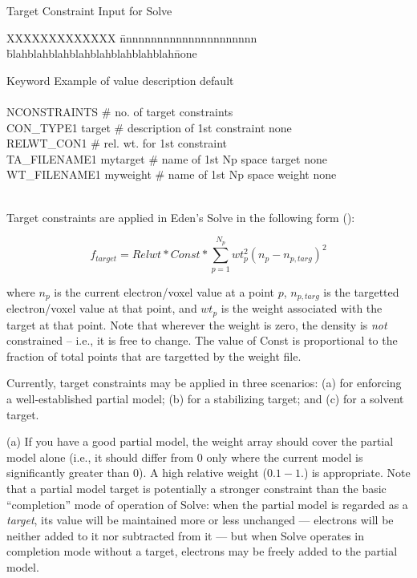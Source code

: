 \documentclass{report}
\begin{document}
{\begin{table} [htb]
\caption {\large Target Constraint Input for Solve}
\label{table-target}

\begin{tabbing}
XXXXXXXXXXXXX \= nnnnnnnnnnnnnnnnnnnnnn \= 
blahblahblahblahblahblahblahblah\= none \kill

Keyword \> Example of value \> description \> default \\
\\ 
NCONSTRAINTS  \> \# no. of target constraints  \\
CON\_TYPE1 \> target \> \# description of 1st constraint \> none \\
RELWT\_CON1  \> \# rel. wt. for 1st constraint  \\
TA\_FILENAME1 \> mytarget \> \# name of 1st Np space target \> none \\
WT\_FILENAME1 \> myweight \> \# name of 1st Np space weight\> none \\
\\
\end{tabbing} 
\end{table}

Target constraints are applied in Eden's Solve in the following 
form (\cite{eden7}):

$$ f_{target} = Relwt * Const * \sum_{p=1}^{N_p} 
            wt_p^2 (n_p - n_{p,targ})^2 $$

where $n_p$ is the current electron/voxel value at a point $p$, $n_{p,targ}$
is the targetted electron/voxel value at that point, 
and $wt_p$ is the weight associated with the target at that point.
Note that wherever the weight is zero, the density is {\em not} constrained -- 
i.e., it is free to change.  The value of Const is proportional to the fraction
of total points that are targetted by the weight file.

\vspace {0.1in}

Currently, target constraints may be applied in three scenarios: 
(a) for enforcing a well-established partial model; 
(b) for a stabilizing target; and (c) for a solvent target.

\vspace {0.1in}

(a) If you have a good partial model, the weight
array should cover the partial model alone (i.e., it should differ from 0 only
where the current model is significantly greater than 0).  A high relative
weight ($0.1 - 1.$) is appropriate.  
Note that a partial model target is potentially a stronger constraint
than the basic ``completion'' mode of operation of Solve: when the partial 
model is regarded as a {\em target}, its value will be maintained more or less
unchanged --- electrons will be neither added to it nor subtracted from it --- 
but when Solve operates in completion mode without a target, 
electrons may be freely added to the partial model.  

}
\end{document}
